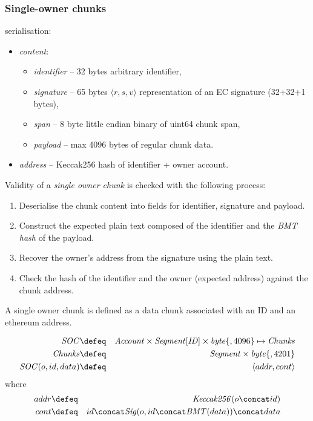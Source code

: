 \subsubsection{Single-owner chunks \statusgreen}

serialisation:
\begin{itemize}[noitemsep]
    \item \emph{content}: 
\begin{itemize}[noitemsep]
    \item \emph{identifier} -- 32 bytes arbitrary identifier, 
    \item \emph{signature} -- 65 bytes $\langle r,s,v \rangle$ representation of an EC signature (32+32+1 bytes),
    \item \emph{span} -- 8 byte little endian binary of uint64 chunk span,
    \item \emph{payload} -- max 4096 bytes of regular chunk data.
\end{itemize}
    \item \emph{address} -- Keccak256 hash of identifier + owner account.
\end{itemize}

Validity of a \emph{single owner chunk} is checked with the following process:

\begin{enumerate}[noitemsep]
    \item Deserialise the chunk content into fields for identifier, signature and payload.
    \item Construct the expected plain text composed of the identifier and the \emph{BMT hash} of the payload.
    \item Recover the owner's address from the signature using the plain text.
    \item Check the hash of the identifier and the owner (expected address) against the chunk address.
\end{enumerate}

\begin{definition}
\label{def:soc}
A single owner chunk  is defined as a data chunk associated with an ID and an ethereum address. 

\begin{eqnarray}
\mathit{SOC} &\defeq& \mathit{Account}\times\mathit{Segment[ID]}\times\mathit{byte}\{,4096\}\mapsto\mathit{Chunks}\\
\mathit{Chunks}&\defeq&\mathit{Segment}\times\mathit{byte}\{,4201\}\\
\mathit{SOC}(o,id,data)&\defeq& \langle addr, cont\rangle
\end{eqnarray}where\begin{eqnarray}
addr&\defeq& \mathit{Keccak256}(o\concat id)\\
cont &\defeq& id\concat\mathit{Sig}(o, id\concat\mathit{BMT}(data))\concat data
\end{eqnarray}
\end{definition}

